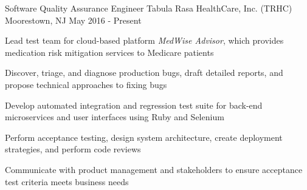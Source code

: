 \begin{cventries}
%

  \cventry
    {Software Quality Assurance Engineer} %
    {Tabula Rasa HealthCare, Inc. (TRHC)} %
    {Moorestown, NJ} %
    {May 2016 - Present} %
    {
      \begin{cvitems} %
        \item {Lead test team for cloud-based platform \emph{MedWise Advisor}, which provides medication risk mitigation services to Medicare patients}
        \item {Discover, triage, and diagnose production bugs, draft detailed reports, and propose technical approaches to fixing bugs}
        \item {Develop automated integration and regression test suite for back-end microservices and user interfaces using Ruby and Selenium}
        \item {Perform acceptance testing, design system architecture, create deployment strategies, and perform code reviews}
        \item {Communicate with product management and stakeholders to ensure acceptance test criteria meets business needs}
      \end{cvitems}
    }


\end{cventries}

